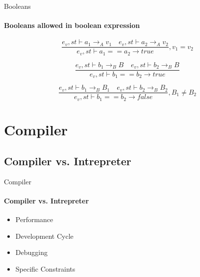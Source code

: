 \begin{frame}{Booleans}
\framesubtitle{Booleans allowed in boolean expression}
\begin{equation}
	\frac { { e }_{ v },st\vdash { a }_{ 1 }{ \rightarrow  }_{ A }{ v }_{ 1 }\quad { e }_{ v },st\vdash { a }_{ 2 }{ \rightarrow  }_{ A }{ v }_{ 2 } }{ { e }_{ v },st\vdash { a }_{ 1 }=={ a }_{ 2 }{ \rightarrow  }true } ,{ v }_{ 1 }={ v }_{ 2 }
\end{equation}

\begin{equation}
	\frac { { e }_{ v },st\vdash { b }_{ 1 }{ \rightarrow  }_{ B }{ B }_{  }\quad { e }_{ v },st\vdash { b }_{ 2 }{ \rightarrow  }_{ B }{ B }_{  } }{ { e }_{ v },st\vdash { b }_{ 1 }=={ b }_{ 2 }{ \rightarrow  }true } 
\end{equation}

\begin{equation}
	\frac { { e }_{ v },st\vdash { b }_{ 1 }{ \rightarrow  }_{ B }{ B }_{ 1 }\quad { e }_{ v },st\vdash { b }_{ 2 }{ \rightarrow  }_{ B }{ B }_{ 2 } }{ { e }_{ v },st\vdash { b }_{ 1 }=={ b }_{ 2 }{ \rightarrow  }false } , { B }_{ 1 } \neq { B }_{ 2 } 
\end{equation}
\end{frame}

\section{Compiler}

    \subsection{Compiler vs. Intrepreter}
    \begin{frame}[t]{Compiler}\framesubtitle{Compiler vs. Intrepreter}
        \begin{itemize}
            \item Performance
            \item Development Cycle
            \item Debugging
            \item Specific Constraints
        \end{itemize}
    \end{frame}

